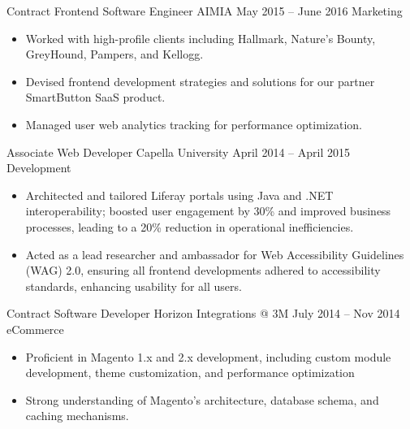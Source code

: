 \medskip
\cvexperience
{Contract Frontend Software Engineer}
{AIMIA}
{May 2015 – June 2016}
{Marketing}
{\footnotesize\faCode \hspace{1pt}      }
\begin{itemize}
    \item Worked with high-profile clients including Hallmark, Nature’s Bounty, GreyHound, Pampers, and Kellogg.
    \item Devised frontend development strategies and solutions for our partner SmartButton SaaS product.
    \item Managed user web analytics tracking for performance optimization.
\end{itemize}

\medskip
\cvexperience
{Associate Web Developer}
{Capella University}
{April 2014 – April 2015}
{Development}
{\footnotesize\faCode \hspace{1pt}       }
\begin{itemize}
    \item Architected and tailored Liferay portals using Java and .NET interoperability; boosted user engagement by 30\% and improved business processes, leading to a 20\% reduction in operational inefficiencies.
    \item Acted as a lead researcher and ambassador for Web Accessibility Guidelines (WAG) 2.0, ensuring all frontend developments adhered to accessibility standards, enhancing usability for all users.
\end{itemize}

\medskip

\cvexperience
{Contract Software Developer}
{Horizon Integrations @ 3M}
{July 2014 – Nov 2014}
{eCommerce}
{\footnotesize\faCode \hspace{1pt}    }
\begin{itemize}
    \item Proficient in Magento 1.x and 2.x development, including custom module development, theme customization, and performance optimization
    \item Strong understanding of Magento's architecture, database schema, and caching mechanisms.
\end{itemize}


